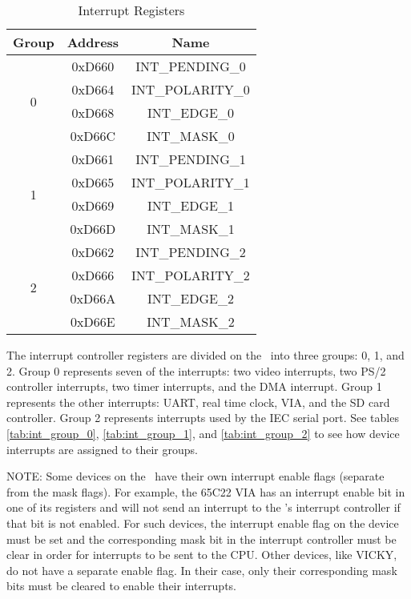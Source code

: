\begin{table}[ht]
	\begin{center}
		\begin{tabular}{|c|c|c|} \hline
            Group & Address & Name \\ \hline\hline
            \multirow{4}{*}{0} & 0xD660 & INT\_PENDING\_0 \\ \cline{2-3}
                               & 0xD664 & INT\_POLARITY\_0 \\ \cline{2-3}
                               & 0xD668 & INT\_EDGE\_0 \\ \cline{2-3}
                               & 0xD66C & INT\_MASK\_0 \\ \hline\hline

            \multirow{4}{*}{1} & 0xD661 & INT\_PENDING\_1 \\ \cline{2-3}
                               & 0xD665 & INT\_POLARITY\_1 \\ \cline{2-3}
                               & 0xD669 & INT\_EDGE\_1 \\ \cline{2-3}
                               & 0xD66D & INT\_MASK\_1 \\ \hline\hline

            \multirow{4}{*}{2} & 0xD662 & INT\_PENDING\_2 \\ \cline{2-3}
                               & 0xD666 & INT\_POLARITY\_2 \\ \cline{2-3}
                               & 0xD66A & INT\_EDGE\_2 \\ \cline{2-3}
                               & 0xD66E & INT\_MASK\_2 \\ \hline
        \end{tabular}
    \end{center}
	\caption{Interrupt Registers}
	\label{tab:int_reg}
\end{table}

The interrupt controller registers are divided on the \jr\ into three groups: 0, 1, and 2. Group 0 represents seven of the interrupts: two video interrupts, two PS/2 controller interrupts, two timer interrupts, and the DMA interrupt. Group 1 represents the other interrupts: UART, real time clock, VIA, and the SD card controller. Group 2 represents interrupts used by the IEC serial port. See tables \ref{tab:int_group_0}, \ref{tab:int_group_1}, and \ref{tab:int_group_2} to see how device interrupts are assigned to their groups.

NOTE: Some devices on the \jr\ have their own interrupt enable flags (separate from the mask flags). For example, the 65C22 VIA has an interrupt enable bit in one of its registers and will not send an interrupt to the \jr's interrupt controller if that bit is not enabled. For such devices, the interrupt enable flag on the device must be set and the corresponding mask bit in the interrupt controller must be clear in order for interrupts to be sent to the CPU. Other devices, like VICKY, do not have a separate enable flag. In their case, only their corresponding mask bits must be cleared to enable their interrupts.

